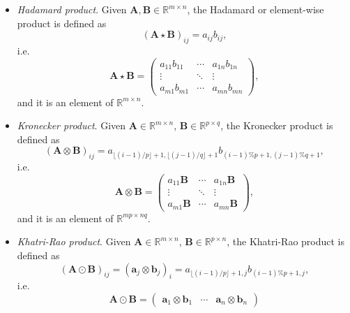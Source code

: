 \documentclass[10pt,titlepage]{article}
\numberwithin{equation}{section}
\numberwithin{figure}{section}
\newcommand{\floor}[1]{\lfloor #1 \rfloor}
\begin{document}
\begin{itemize}
\item \textit{Hadamard product}. 
	Given $\mathbf{A},\mathbf{B} \in \mathbb{R}^{m \times n}$, the Hadamard or element-wise product is defined as
	\begin{equation}
	(\mathbf{A} \star \mathbf{B})_{ij}=a_{ij} b_{ij},
	\label{eqn:hadamard}
	\end{equation}
	i.e.
	\begin{equation}
	\mathbf{A} \star \mathbf{B}=
	\begin{pmatrix}
	a_{11} b_{11} & \cdots & a_{1n}b_{1n} \\ \vdots & \ddots & \vdots \\ a_{m1}b_{m1} & \cdots & a_{mn}b_{mn}
	\end{pmatrix},
	\label{eqn:hadamard_mat}
	\end{equation}
	and it is an element of $\mathbb{R}^{m \times n}$.
\item \textit{Kronecker product}. 
	Given $\mathbf{A} \in \mathbb{R}^{m \times n}$, $\mathbf{B} \in \mathbb{R}^{p \times q}$, the Kronecker product is defined as
	\begin{equation}
	(\mathbf{A} \otimes \mathbf{B})_{ij}=a_{\floor{(i-1)/p}+1,\floor{(j-1)/q}+1} b_{(i-1) \% p+1,(j-1) \% q+1},
	\label{eqn:kronecker}
	\end{equation}
	i.e.
	\begin{equation}
	\mathbf{A} \otimes \mathbf{B}=
	\begin{pmatrix}
	a_{11} \mathbf{B} & \cdots & a_{1n}\mathbf{B} \\ \vdots & \ddots & \vdots \\ a_{m1}\mathbf{B} & \cdots & a_{mn}\mathbf{B} 
	\end{pmatrix},
	\label{eqn:kronecker_mat}
	\end{equation}
	and it is an element of $\mathbb{R}^{mp \times nq}$.
\item \textit{Khatri-Rao product}. 
	Given $\mathbf{A} \in \mathbb{R}^{m \times n}$, $\mathbf{B} \in \mathbb{R}^{p \times n}$, the Khatri-Rao product is defined as
	\begin{equation}
	(\mathbf{A} \odot \mathbf{B})_{ij}=(\mathbf{a}_{j} \otimes \mathbf{b}_{j})_i= a_{\floor{(i-1)/p}+1,j} b_{(i-1) \% p+1,j},
	\label{eqn:khatri}
	\end{equation}
	i.e.
	\begin{equation}
	\mathbf{A} \odot \mathbf{B}=
	\begin{pmatrix}
	\mathbf{a}_{1} \otimes \mathbf{b}_{1} & \cdots & \mathbf{a}_{n} \otimes \mathbf{b}_{n}

\end{pmatrix}
\end{equation}
\end{itemize}
\end{document}
